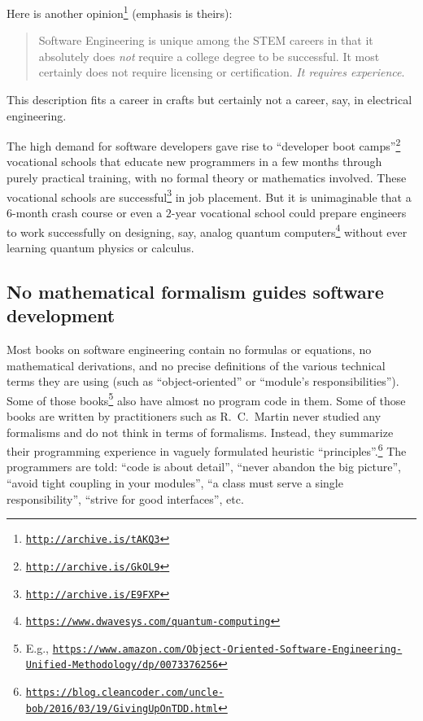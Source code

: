 Here is another opinion\footnote{\texttt{\href{http://archive.is/tAKQ3}{http://archive.is/tAKQ3}}}
(emphasis is theirs):
\begin{quotation}
{\small{}Software Engineering is unique among the STEM careers in
that it absolutely does }\emph{\small{}not}{\small{} require a college
degree to be successful. It most certainly does not require licensing
or certification. }\emph{\small{}It requires experience}{\small{}.}{\small\par}
\end{quotation}
This description fits a career in crafts \textemdash{} but certainly
not a career, say, in electrical engineering.

The high demand for software developers gave rise to \textsf{``}developer
boot camps\textsf{''}\footnote{\texttt{\href{http://archive.is/GkOL9}{http://archive.is/GkOL9}}}
\textemdash{} vocational schools that educate new programmers in a
few months through purely practical training, with no formal theory
or mathematics involved. These vocational schools are successful\footnote{\texttt{\href{http://archive.is/E9FXP}{http://archive.is/E9FXP}}}
in job placement. But it is unimaginable that a $6$-month crash course
or even a $2$-year vocational school could prepare engineers to work
successfully on designing, say, analog quantum computers\footnote{\texttt{\href{https://www.dwavesys.com/quantum-computing}{https://www.dwavesys.com/quantum-computing}}}
without ever learning quantum physics or calculus.

\subsection{No mathematical formalism guides software development}

Most books on software engineering contain no formulas or equations,
no mathematical derivations, and no precise definitions of the various
technical terms they are using (such as \textsf{``}object-oriented\textsf{''} or \textsf{``}module\textsf{'}s
responsibilities\textsf{''}). Some of those books\footnote{E.g., \texttt{\href{https://www.amazon.com/Object-Oriented-Software-Engineering-Unified-Methodology/dp/0073376256}{https://www.amazon.com/Object-Oriented-Software-Engineering-Unified-Methodology/dp/0073376256}}}
also have almost no program code in them. Some of those books are
written by practitioners such as R.\ C.\ Martin never studied any
formalisms and do not think in terms of formalisms. Instead, they
summarize their programming experience in vaguely formulated heuristic
\textquotedblleft principles\textquotedblright .\footnote{\texttt{\href{https://blog.cleancoder.com/uncle-bob/2016/03/19/GivingUpOnTDD.html}{https://blog.cleancoder.com/uncle-bob/2016/03/19/GivingUpOnTDD.html}}}
The programmers are told: \textsf{``}code is about detail\textsf{''}, \textsf{``}never abandon
the big picture\textsf{''}, \textsf{``}avoid tight coupling in your modules\textsf{''}, \textsf{``}a
class must serve a single responsibility\textsf{''}, \textsf{``}strive for good interfaces\textsf{''},
etc. 

